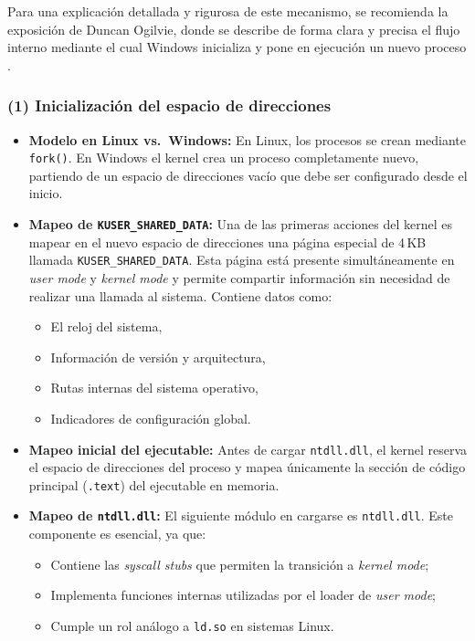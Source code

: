 Para una explicación detallada y rigurosa de este mecanismo, se recomienda la exposición de Duncan Ogilvie, donde se describe de forma clara y precisa el flujo interno mediante el cual Windows inicializa y pone en ejecución un nuevo proceso \cite{ogilvie_windows_internals_crash_course}.

\subsubsection*{(1) Inicialización del espacio de direcciones}

\begin{itemize}[leftmargin=1.5cm]

    \item \textbf{Modelo en Linux vs.\ Windows:}  
    En Linux, los procesos se crean mediante \texttt{fork()}.  
    En Windows el kernel crea un proceso completamente nuevo, partiendo de un espacio de direcciones vacío que debe ser configurado desde el inicio.

    \item \textbf{Mapeo de \texttt{KUSER\_SHARED\_DATA}:}  
    Una de las primeras acciones del kernel es mapear en el nuevo espacio de direcciones una página especial de 4\,KB llamada \texttt{KUSER\_SHARED\_DATA}.  
    Esta página está presente simultáneamente en \textit{user mode} y \textit{kernel mode} y permite compartir información sin necesidad de realizar una llamada al sistema.  
    Contiene datos como:
    \begin{itemize}
        \item El reloj del sistema,
        \item Información de versión y arquitectura,
        \item Rutas internas del sistema operativo,
        \item Indicadores de configuración global.
    \end{itemize}

    \item \textbf{Mapeo inicial del ejecutable:}  
    Antes de cargar \texttt{ntdll.dll}, el kernel reserva el espacio de direcciones del proceso y mapea únicamente la sección de código principal (\texttt{.text}) del ejecutable en memoria.  
    
    \item \textbf{Mapeo de \texttt{ntdll.dll}:}  
    El siguiente módulo en cargarse es \texttt{ntdll.dll}.  
    Este componente es esencial, ya que:
    \begin{itemize}
        \item Contiene las \textit{syscall stubs} que permiten la transición a \textit{kernel mode};
        \item Implementa funciones internas utilizadas por el loader de \textit{user mode};
        \item Cumple un rol análogo a \texttt{ld.so} en sistemas Linux.
    \end{itemize}


\end{itemize}
